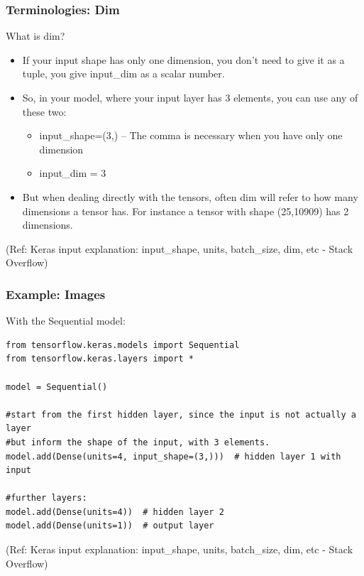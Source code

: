 \begin{frame}[fragile] \frametitle{Terminologies: Dim}

What is dim?

\begin{itemize}
\item If your input shape has only one dimension, you don't need to give it as a tuple, you give input\_dim as a scalar number.
\item So, in your model, where your input layer has 3 elements, you can use any of these two:
\begin{itemize}
\item input\_shape=(3,) -- The comma is necessary when you have only one dimension
\item input\_dim = 3
\end{itemize}
\item But when dealing directly with the tensors, often dim will refer to how many dimensions a tensor has. For instance a tensor with shape (25,10909) has 2 dimensions.
\end{itemize}

\tiny{(Ref: Keras input explanation: input\_shape, units, batch\_size, dim, etc - Stack Overflow)}
\end{frame}

\begin{frame}[fragile] \frametitle{Example: Images}

With the Sequential model:

\begin{lstlisting}
from tensorflow.keras.models import Sequential
from tensorflow.keras.layers import *

model = Sequential()

#start from the first hidden layer, since the input is not actually a layer
#but inform the shape of the input, with 3 elements.
model.add(Dense(units=4, input_shape=(3,)))  # hidden layer 1 with input

#further layers:
model.add(Dense(units=4))  # hidden layer 2
model.add(Dense(units=1))  # output layer
\end{lstlisting}

\tiny{(Ref: Keras input explanation: input\_shape, units, batch\_size, dim, etc - Stack Overflow)}
\end{frame}

